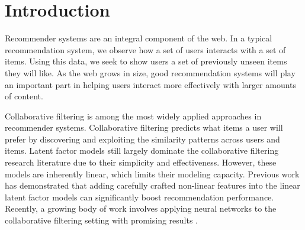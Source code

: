 \documentclass[sigconf]{acmart}
\begin{document}
\acmPrice{}

\fancyhead{}

\maketitle

\section{Introduction}

Recommender systems are an integral component of the web. 
In a typical recommendation system, we observe how a set of users interacts with a set of items. Using this data, we seek to show users a set of previously unseen items they 
will like. As the web grows in size, good recommendation systems will play an important part in helping users interact more 
effectively with larger amounts of content. 

Collaborative filtering is among the most widely applied approaches in recommender systems. 
Collaborative filtering predicts what items a user will prefer by discovering and exploiting the similarity patterns across users and items. 
Latent factor models \citep{salakhutdinov2008probabilistic,hu2008collaborative,gopalan2015scalable} still 
largely dominate the collaborative filtering research literature due to their simplicity and effectiveness. 
However, these models are inherently linear, which limits their modeling capacity. Previous 
work \citep{liang2016factorization} has demonstrated that adding carefully crafted 
non-linear features into the linear latent factor models can significantly boost recommendation 
performance. Recently, a growing body of work involves applying neural networks to the collaborative filtering setting with promising results \citep{pmlr-v48-zheng16,sedhain2015autorec,wu2016collaborative,he2017neural}.  
\end{document}
